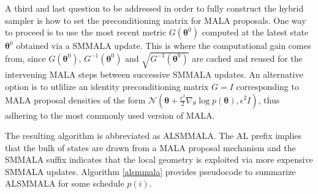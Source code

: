 \documentclass[twoside,11pt]{article}
\begin{document}
A third and last question to be addressed in order to fully construct the hybrid sampler is how to set the preconditioning 
matrix for MALA proposals. One way to proceed is to use the most recent metric $G(\boldsymbol{\theta}^0)$ computed at the 
latest state $\boldsymbol{\theta}^0$ obtained via a SMMALA update. This is where the computational gain comes from, since 
$G(\boldsymbol{\theta}^0)$, $G^{-1}(\boldsymbol{\theta}^0)$ and $\sqrt{G^{-1}(\boldsymbol{\theta}^0)}$ are cached and reused 
for the intervening MALA steps between successive SMMALA updates. An alternative option is to utlilize an identity 
preconditioning matrix $G=I$ corresponding to MALA proposal densities of the form
$\mathcal{N}(\boldsymbol{\theta}+\frac{\epsilon^2}{2}\nabla_{\theta}\log{p(\boldsymbol{\theta})}, \epsilon^2 I)$,
thus adhering to the most commonly used version of MALA.

The resulting algorithm is abbreviated as ALSMMALA. The AL prefix implies that the bulk of states are drawn from a MALA 
proposal mechanism and the SMMALA suffix indicates that the local geometry is exploited via more expensive SMMALA updates.
Algorithm \ref{alsmmala} provides pseudocode to summarize ALSMMALA for some schedule $p(i)$.
\end{document}
